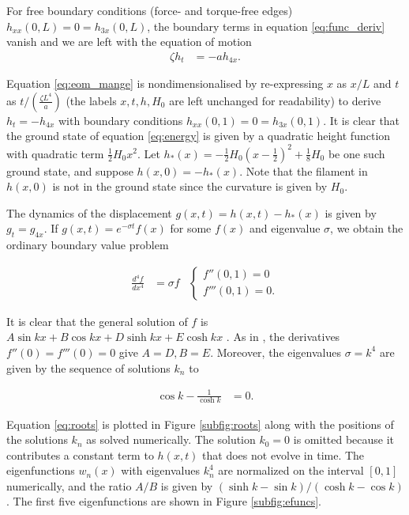 For free boundary conditions (force- and torque-free edges) $h_{xx}(0, L) = 0 = h_{3x}(0, L)$, the boundary terms in equation \ref{eq:func_deriv} vanish and we are left with the equation of motion 
\begin{align}
    \zeta h_t &= -a h_{4x}. \label{eq:eom_mange}
\end{align}

Equation \ref{eq:eom_mange} is nondimensionalised by re-expressing $x$ as $x/L$ and $t$ as $t / (\frac{\zeta L^4}{a})$ (the labels $x, t, h, H_0$ are left unchanged for readability) to derive $h_t = -h_{4x}$ with boundary conditions $h_{xx}(0, 1) = 0 = h_{3x}(0, 1)$. 
It is clear that the ground state of equation \ref{eq:energy} is given by a quadratic height function with quadratic term $\frac{1}{2}H_0x^2$. 
Let $h_*(x) = -\frac{1}{2} H_0(x-\frac{1}{2})^2 + \frac{1}{8}H_0$ be one such ground state, and suppose $h(x, 0) = -h_*(x)$. Note that the filament in $h(x, 0)$ is not in the ground state since the curvature is given by $H_0$. 

The dynamics of the displacement $g(x, t) = h(x, t) - h_*(x)$ is given by $g_t = g_{4x}$. 
If $g(x, t) = e^{-\sigma t} f(x)$ for some $f(x)$ and eigenvalue $\sigma$, we obtain the ordinary boundary value problem 

\begin{align}
    \frac{d^4f}{dx^4} &= \sigma f & \begin{cases} f''(0, 1) = 0 \\ f'''(0, 1) = 0. \end{cases} \label{eq:bvp}
\end{align}

It is clear that the general solution of $f$ is $A \sin kx + B \cos kx + D \sinh kx + E \cosh kx$ \citep{landau1986}. 
As in \citet{wiggins1998}, the derivatives $f''(0) = f'''(0) = 0$ give $A = D, B = E$. 
Moreover, the eigenvalues $\sigma = k^4$ are given by the sequence of solutions $k_n$ to 

\begin{align}
    \cos k - \frac{1}{\cosh k} &= 0. \label{eq:roots}
\end{align}

Equation \ref{eq:roots} is plotted in Figure \ref{subfig:roots} along with the positions of the solutions $k_n$ as solved numerically. 
The solution $k_0 = 0$ is omitted because it contributes a constant term to $h(x, t)$ that does not evolve in time. 
The eigenfunctions $w_n(x)$ with eigenvalues $k_n^4$ are normalized on the interval $[0,1]$ numerically, and the ratio $A/B$ is given by $(\sinh k - \sin k) / (\cosh k - \cos k)$. 
The first five eigenfunctions are shown in Figure \ref{subfig:efuncs}. 

